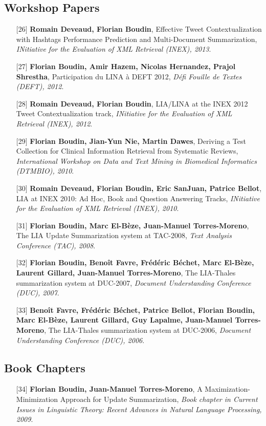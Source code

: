\documentclass[11pt,a4paper]{moderncv}
\begin{document}
    \subsection{Workshop Papers}
    \begin{itemize}[leftmargin=1.2cm,itemsep=0.1cm]
        \item[{\small$[$26$]$}] \textbf{Romain Deveaud, Florian Boudin}, Effective Tweet Contextualization with Hashtags Performance Prediction and Multi-Document Summarization, \textit{INitiative for the Evaluation of XML Retrieval (INEX), 2013}.
        \item[{\small$[$27$]$}] \textbf{Florian Boudin, Amir Hazem, Nicolas Hernandez, Prajol Shrestha}, Participation du LINA à DEFT 2012, \textit{Défi Fouille de Textes (DEFT), 2012}.
        \item[{\small$[$28$]$}] \textbf{Romain Deveaud, Florian Boudin}, LIA/LINA at the INEX 2012 Tweet Contextualization track, \textit{INitiative for the Evaluation of XML Retrieval (INEX), 2012}.
        \item[{\small$[$29$]$}] \textbf{Florian Boudin, Jian-Yun Nie, Martin Dawes}, Deriving a Test Collection for Clinical Information Retrieval from Systematic Reviews, \textit{International Workshop on Data and Text Mining in Biomedical Informatics (DTMBIO), 2010}.
        \item[{\small$[$30$]$}] \textbf{Romain Deveaud, Florian Boudin, Eric SanJuan, Patrice Bellot}, LIA at INEX 2010: Ad Hoc, Book and Question Answering Tracks, \textit{INitiative for the Evaluation of XML Retrieval (INEX), 2010}.
        \item[{\small$[$31$]$}] \textbf{Florian Boudin, Marc El-Bèze, Juan-Manuel Torres-Moreno}, The LIA Update Summarization system at TAC-2008, \textit{Text Analysis Conference (TAC), 2008}.
        \item[{\small$[$32$]$}] \textbf{Florian Boudin, Benoît Favre, Frédéric Béchet, Marc El-Bèze, Laurent Gillard, Juan-Manuel Torres-Moreno}, The LIA-Thales summarization system at DUC-2007, \textit{Document Understanding Conference (DUC), 2007}.
        \item[{\small$[$33$]$}] \textbf{Benoît Favre, Frédéric Béchet, Patrice Bellot, Florian Boudin, Marc El-Bèze, Laurent Gillard, Guy Lapalme, Juan-Manuel Torres-Moreno}, The LIA-Thales summarization system at DUC-2006, \textit{Document Understanding Conference (DUC), 2006}.
    \end{itemize}
    \subsection{Book Chapters}
    \begin{itemize}[leftmargin=1.2cm,itemsep=0.1cm]
        \item[{\small$[$34$]$}] \textbf{Florian Boudin, Juan-Manuel Torres-Moreno}, A Maximization-Minimization Approach for Update Summarization, \textit{Book chapter in Current Issues in Linguistic Theory: Recent Advances in Natural Language Processing, 2009}.
    \end{itemize}
\end{document}
